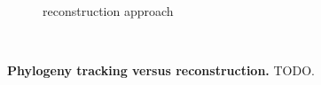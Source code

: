 \begin{figure}
\begin{minipage}{0.65\linewidth}
\begin{subfigure}{0.35\linewidth}
  \caption{\footnotesize reconstruction approach}
  \label{fig:tracking-vs-reconstruction-schematic:reconstruction}
\end{subfigure}%
\begin{subfigure}{0.02\linewidth}~\end{subfigure}%
\end{minipage}%
\begin{minipage}{0.35\textwidth}
  \caption{%
  \textbf{Phylogeny tracking versus reconstruction.}
  \footnotesize
  TODO.
  }
  \label{fig:tracking-vs-reconstruction-schematic}
\end{minipage}
\end{figure}
